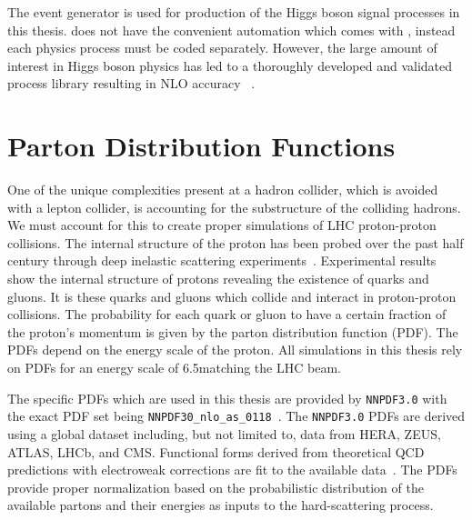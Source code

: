 The \POWHEG event generator is used for production of the Higgs boson signal processes in
this thesis. \POWHEG does not have the convenient automation which comes with \MGAMCNLO, instead each
physics process must be coded separately. However, the large amount of interest in Higgs boson physics
has led to a thoroughly developed and validated process library resulting in NLO accuracy
~\cite{Alioli:2010xa,Alioli:2008tz,Brein:2003wg,Ravindran:2003um,deFlorian:2012mx}.




\section{Parton Distribution Functions}
\label{sec:sim_pdf}
One of the unique complexities present at a hadron collider, which is avoided with a
lepton collider, is accounting for the substructure of the colliding hadrons. 
We must account for this to create proper simulations
of LHC proton-proton collisions. The internal structure of the proton
has been probed over the past half century through deep inelastic scattering
experiments~\cite{Breidenbach:1969kd, PhysRevLett.23.930}.
Experimental results show the internal structure of protons revealing the existence of
quarks and gluons. It is these quarks and gluons which collide and interact in
proton-proton collisions.
The probability for each quark or gluon to have a certain fraction
of the proton's momentum is given by the parton distribution function (PDF).
The PDFs depend on the energy scale of the proton. All simulations
in this thesis rely on PDFs for an energy scale of 6.5\TeV matching the LHC beam.

The specific PDFs which are used in this thesis
 are provided by \texttt{NNPDF3.0} with the exact PDF set being 
\texttt{NNPDF30\_nlo\_as\_0118}~\cite{Ball:2014uwa, Ball:2011uy}. The \texttt{NNPDF3.0} PDFs
are derived using a global dataset including, but not limited to, data from HERA, ZEUS, ATLAS, LHCb, and CMS.
Functional forms derived from theoretical QCD predictions with electroweak corrections are fit
to the available data~\cite{Ball:2014uwa}.
The PDFs provide proper normalization based on the probabilistic distribution of the 
available partons and their energies as inputs to the hard-scattering process.



